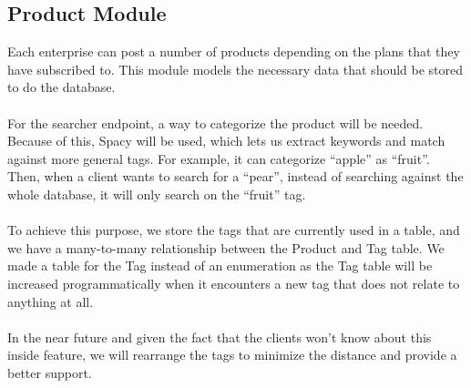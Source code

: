 \documentclass[./main.tex]{subfiles}
\begin{document}
\subsection{Product Module}
Each enterprise can post a number of products depending on the plans
that they have subscribed to. This module models the necessary data that
should be stored to do the database.
\\
\\
For the searcher endpoint, a way to categorize the product will be
needed. Because of this, Spacy will be used, which lets us extract keywords and
match against more general tags. For example, it can categorize
``apple'' as ``fruit''. Then, when a client wants to search for a
``pear'', instead of searching against the whole database, it will only
search on the ``fruit'' tag.
\\
\\
To achieve this purpose, we store the tags that are currently used in a
table, and we have a many-to-many relationship between the Product and
Tag table. We made a table for the Tag instead of an enumeration as the
Tag table will be increased programmatically when it encounters a new tag
that does not relate to anything at all.
\\
\\
In the near future and given the fact that the clients won't know about
this inside feature, we will rearrange the tags to minimize the distance
and provide a better support.
\end{document}
